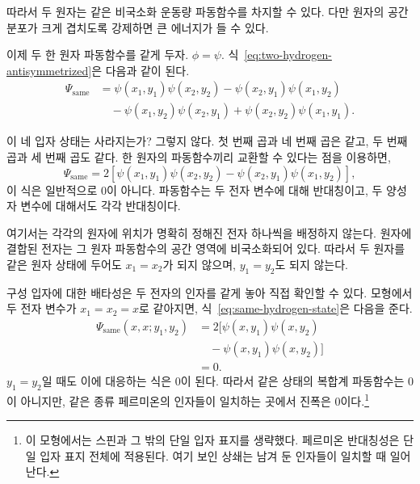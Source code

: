 따라서 두 원자는 같은 비국소화 운동량 파동함수를 차지할 수 있다. 다만 원자의 공간 분포가 크게 겹치도록 강제하면 큰 에너지가 들 수 있다.

이제 두 한 원자 파동함수를 같게 두자. \(\phi=\psi\). 식~\eqref{eq:two-hydrogen-antisymmetrized}은 다음과 같이 된다.
\begin{align}
\Psi_{\mathrm{same}}
&=\psi(x_1,y_1)\psi(x_2,y_2)
-\psi(x_2,y_1)\psi(x_1,y_2)\nonumber\\
&\quad
-\psi(x_1,y_2)\psi(x_2,y_1)
+\psi(x_2,y_2)\psi(x_1,y_1).
\end{align}

이 네 입자 상태는 사라지는가? 그렇지 않다. 첫 번째 곱과 네 번째 곱은 같고, 두 번째 곱과 세 번째 곱도 같다. 한 원자의 파동함수끼리 교환할 수 있다는 점을 이용하면,
\begin{equation}
\Psi_{\mathrm{same}}
=
2\left[
\psi(x_1,y_1)\psi(x_2,y_2)
-\psi(x_2,y_1)\psi(x_1,y_2)
\right],
\label{eq:same-hydrogen-state}
\end{equation}
이 식은 일반적으로 0이 아니다. 파동함수는 두 전자 변수에 대해 반대칭이고, 두 양성자 변수에 대해서도 각각 반대칭이다.

여기서는 각각의 원자에 위치가 명확히 정해진 전자 하나씩을 배정하지 않는다. 원자에 결합된 전자는 그 원자 파동함수의 공간 영역에 비국소화되어 있다. 따라서 두 원자를 같은 원자 상태에 두어도 \(x_1=x_2\)가 되지 않으며, \(y_1=y_2\)도 되지 않는다.

구성 입자에 대한 배타성은 두 전자의 인자를 같게 놓아 직접 확인할 수 있다. 모형에서 두 전자 변수가 \(x_1=x_2=x\)로 같아지면, 식~\eqref{eq:same-hydrogen-state}은 다음을 준다.
\begin{align}
\Psi_{\mathrm{same}}(x,x;y_1,y_2)
&=2\bigl[
\psi(x,y_1)\psi(x,y_2)\nonumber\\
&\quad{}-\psi(x,y_1)\psi(x,y_2)
\bigr]\\
&=0.
\end{align}
\(y_1=y_2\)일 때도 이에 대응하는 식은 0이 된다. 따라서 같은 상태의 복합계 파동함수는 0이 아니지만, 같은 종류 페르미온의 인자들이 일치하는 곳에서 진폭은 0이다.\footnote{이 모형에서는 스핀과 그 밖의 단일 입자 표지를 생략했다. 페르미온 반대칭성은 단일 입자 표지 전체에 적용된다. 여기 보인 상쇄는 남겨 둔 인자들이 일치할 때 일어난다.}

\begin{classroomqa}
\end{classroomqa}

